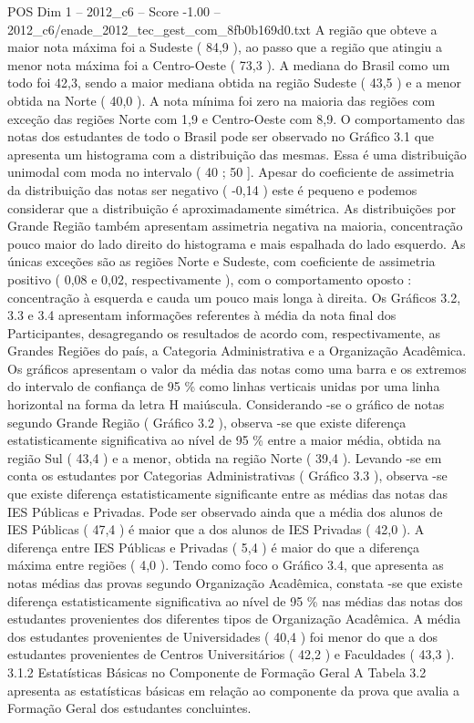 \begin{textsample}{POS Dim 1 – 2012\_c6 – Score -1.00 – 2012\_c6/enade\_2012\_tec\_gest\_com\_8fb0b169d0.txt}
A região que obteve a maior nota máxima foi a Sudeste ( 84,9 ), ao passo que a região que atingiu a menor nota máxima foi a Centro-Oeste ( 73,3 ).
A mediana do Brasil como um todo foi 42,3, sendo a maior mediana obtida na região Sudeste ( 43,5 ) e a menor obtida na Norte ( 40,0 ).
A nota mínima foi zero na maioria das regiões com exceção das regiões Norte com 1,9 e Centro-Oeste com 8,9.
O comportamento das notas dos estudantes de todo o Brasil pode ser observado no Gráfico 3.1 que apresenta um histograma com a distribuição das mesmas.
Essa é uma distribuição unimodal com moda no intervalo ( 40 ; 50 ].
Apesar do coeficiente de assimetria da distribuição das notas ser negativo ( -0,14 ) este é pequeno e podemos considerar que a distribuição é aproximadamente simétrica.
As distribuições por Grande Região também apresentam assimetria negativa na maioria, concentração pouco maior do lado direito do histograma e mais espalhada do lado esquerdo.
As únicas exceções são as regiões Norte e Sudeste, com coeficiente de assimetria positivo ( 0,08 e 0,02, respectivamente ), com o comportamento oposto : concentração à esquerda e cauda um pouco mais longa à direita.
Os Gráficos 3.2, 3.3 e 3.4 apresentam informações referentes à média da nota final dos Participantes, desagregando os resultados de acordo com, respectivamente, as Grandes Regiões do país, a Categoria Administrativa e a Organização Acadêmica.
Os gráficos apresentam o valor da média das notas como uma barra e os extremos do intervalo de confiança de 95 \% como linhas verticais unidas por uma linha horizontal na forma da letra H maiúscula.
Considerando -se o gráfico de notas segundo Grande Região ( Gráfico 3.2 ), observa -se que existe diferença estatisticamente significativa ao nível de 95 \% entre a maior média, obtida na região Sul ( 43,4 ) e a menor, obtida na região Norte ( 39,4 ).
Levando -se em conta os estudantes por Categorias Administrativas ( Gráfico 3.3 ), observa -se que existe diferença estatisticamente significante entre as médias das notas das IES Públicas e Privadas.
Pode ser observado ainda que a média dos alunos de IES Públicas ( 47,4 ) é maior que a dos alunos de IES Privadas ( 42,0 ).
A diferença entre IES Públicas e Privadas ( 5,4 ) é maior do que a diferença máxima entre regiões ( 4,0 ).
Tendo como foco o Gráfico 3.4, que apresenta as notas médias das provas segundo Organização Acadêmica, constata -se que existe diferença estatisticamente significativa ao nível de 95 \% nas médias das notas dos estudantes provenientes dos diferentes tipos de Organização Acadêmica.
A média dos estudantes provenientes de Universidades ( 40,4 ) foi menor do que a dos estudantes provenientes de Centros Universitários ( 42,2 ) e Faculdades ( 43,3 ). 3.1.2 Estatísticas Básicas no Componente de Formação Geral A Tabela 3.2 apresenta as estatísticas básicas em relação ao componente da prova que avalia a Formação Geral dos estudantes concluintes.

\end{textsample}
